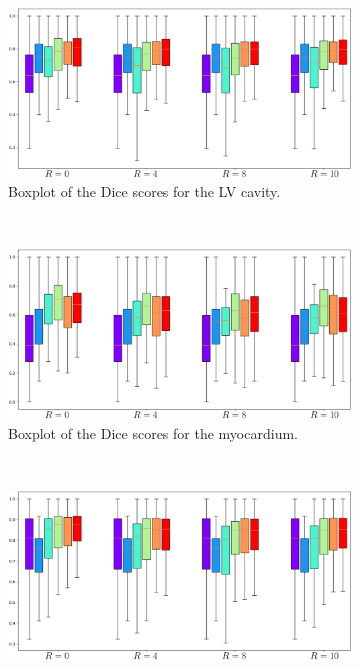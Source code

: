 \begin{figure}[H]
	\centering
	\graphicspath{{images/}{\main/images/}}
	\begin{subfigure}{0.85\textwidth}
    		\includegraphics[width=\textwidth]{Boxplot_DiceScores_LV-Cavity.pdf}
    		\caption{Boxplot of the Dice scores for the LV cavity.} %
    		\label{fig:Boxplot_DiceScores_LV-Cavity}
	\end{subfigure}
	\\
	\begin{subfigure}{0.85\textwidth}
    		\includegraphics[width=\textwidth]{Boxplot_DiceScores_Myocardium.pdf}
    		\caption{Boxplot of the Dice scores for the myocardium.} %
    		\label{fig:Boxplot_DiceScores_Myocardium}
	\end{subfigure}
	\\
	\begin{subfigure}{0.85\textwidth}
    		\includegraphics[width=\textwidth]{Boxplot_DiceScores_RV-Cavity.pdf}

\end{subfigure}
\end{figure}
